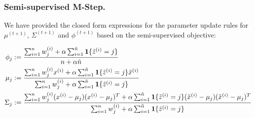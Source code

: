 \subsubsection*{Semi-supervised M-Step.}
We have provided the closed form expressions for the parameter update rules for $\mu^{(t+1)}$, $\Sigma^{(t+1)}$ and $\phi^{(t+1)}$ based on the semi-supervised objective:

\begin{align*}
  \phi_j & := \frac{ \sum_{i=1}^{n} w^{(i)}_j + \alpha \sum_{i=1}^{\tilde{{n}}}\textbf{1}\{\tilde{z}^{(i)} = j\}}{{n} + \alpha \tilde{{n}}} \\
  \mu_j & := \frac{ \sum_{i=1}^{n} w^{(i)}_jx^{(i)} + \alpha\sum_{i=1}^{\tilde{{n}}} \textbf{1}\{\tilde{z}^{(i)} = j\}\tilde{x}^{(i)}} {\sum_{i=1}^{n} w^{(i)}_j + \alpha\sum_{i=1}^{\tilde{{n}}} \textbf{1}\{\tilde{z}^{(i)} = j\} } \\
  \Sigma_j & := \frac{ \sum_{i=1}^{n} w^{(i)}_j(x^{(i)}-\mu_j)(x^{(i)}-\mu_j)^T + \alpha\sum_{i=1}^{\tilde{{n}}} \textbf{1}\{\tilde{z}^{(i)} = j\}(\tilde{x}^{(i)}-\mu_j)(\tilde{x}^{(i)}-\mu_j)^T} {\sum_{i=1}^{n} w^{(i)}_j + \alpha\sum_{i=1}^{\tilde{{n}}} \textbf{1}\{\tilde{z}^{(i)} = j\} }
\end{align*}

